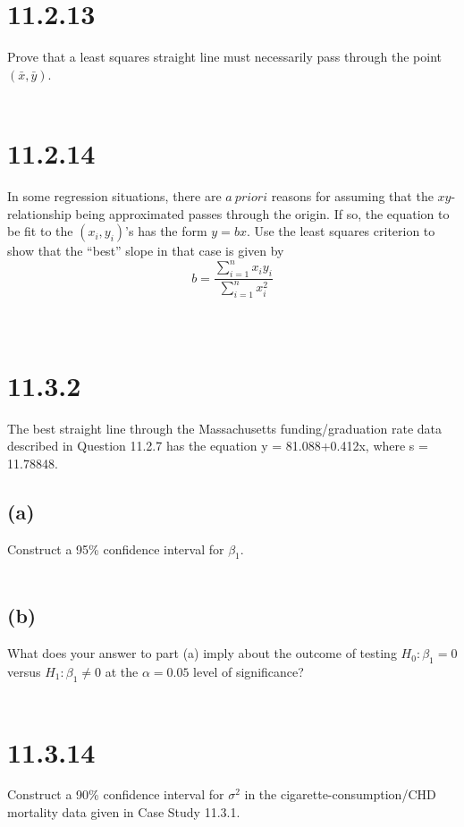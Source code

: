 \documentclass{article}
\begin{document}
{\section*{11.2.13}
Prove that a least squares straight line must necessarily
pass through the point \(( \bar{x}, \bar{y})\).
\\
\\


\section*{11.2.14}
In some regression situations, there are \(a ~ priori\) reasons for assuming that the \(xy\)-relationship being approximated passes through the origin. If so, the equation to be fit to the \((x_i, y_i)\)'s has the form \(y = bx\). Use the least squares criterion to show that the “best” slope in that case is given by 
\[
b = \frac{\sum_{i=1}^n x_i y_i}{\sum_{i=1}^{n} x_i^2}
\]
\\
\\


\section*{11.3.2}
The best straight line through the Massachusetts funding/graduation rate data described in Question 11.2.7
has the equation y = 81.088+0.412x, where s = 11.78848.

\subsection*{(a)} 
Construct a 95\% confidence interval for \(\beta_1\).
\\
\\


\subsection*{(b)}
What does your answer to part (a) imply about the outcome of testing \(H_0: \beta_1 = 0\) versus \(H_1: \beta_1 \neq 0\) at the \(\alpha = 0.05\) level of significance?
\\
\\


\section*{11.3.14}
Construct a 90\% confidence interval for \(\sigma^2\) in the cigarette-consumption/CHD mortality data given in Case Study 11.3.1.
\\
\\


}
\end{document}
